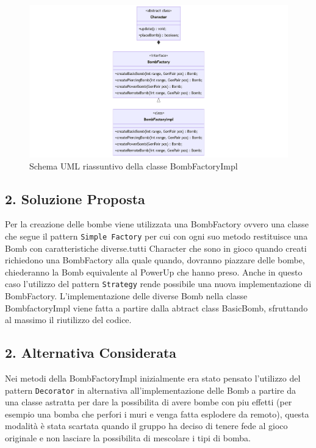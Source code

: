 \documentclass[a4paper,12pt]{report}
\begin{document}
\begin{figure}[H]
\centering{}
\includegraphics[width=\textwidth]{img/bombFactory.png}
\caption{Schema UML riassuntivo della classe BombFactoryImpl}
\end{figure}

\subsection*{2. Soluzione Proposta}
\par
Per la creazione delle bombe viene utilizzata una BombFactory ovvero una classe che segue il pattern \verb|Simple Factory| per cui con ogni suo metodo restituisce una Bomb con caratteristiche diverse.tutti Character che sono in gioco quando creati richiedono una BombFactory alla quale quando, dovranno piazzare delle bombe, chiederanno la Bomb equivalente al PowerUp che hanno preso. Anche in questo caso l'utilizzo del pattern \verb|Strategy| rende possibile una nuova implementazione di BombFactory.  L'implementazione delle diverse Bomb nella classe BombfactoryImpl viene fatta a partire dalla abtract class BasicBomb, sfruttando al massimo il riutilizzo del codice.


\subsection*{2. Alternativa Considerata}
\par
Nei metodi della BombFactoryImpl inizialmente era stato pensato l'utilizzo del pattern \verb|Decorator| in alternativa all'implementazione delle Bomb a partire da una classe astratta per dare la possibilita di avere bombe con piu effetti (per esempio una bomba che perfori i muri e venga fatta esplodere da remoto), questa modalità è stata scartata quando il gruppo ha deciso di tenere fede al gioco originale e non lasciare la possibilita di mescolare i tipi di bomba.
\end{document}
